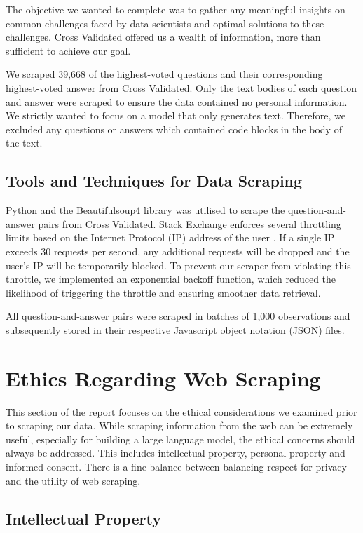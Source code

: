 \documentclass[10pt]{article}
\begin{document}
The objective we wanted to complete was to gather any meaningful insights on common challenges
faced by data scientists and optimal solutions to these challenges. Cross Validated offered us a wealth of
information, more than sufficient to achieve our goal.

We scraped 39,668 of the highest-voted questions and their corresponding highest-voted answer from Cross Validated.
Only the text bodies of each question and answer were scraped to ensure the data contained no personal information.
We strictly wanted to focus on a model that only generates text. Therefore, we excluded any questions or answers
which contained code blocks in the body of the text.

\subsection{Tools and Techniques for Data Scraping}

Python and the Beautifulsoup4 library \cite{beautifulsoup} was utilised to scrape the question-and-answer pairs
from Cross Validated. Stack Exchange enforces several throttling limits based on the Internet Protocol (IP)
address of the user \cite{stackexchange-throttle}. If a single IP exceeds 30 requests per second, 
any additional requests will be dropped and the user's IP will be temporarily blocked. To prevent our scraper from
violating this throttle, we implemented an exponential backoff function, which reduced the likelihood of
triggering the throttle and ensuring smoother data retrieval.

All question-and-answer pairs were scraped in batches of 1,000 observations and subsequently
stored in their respective Javascript object notation (JSON) files.

\section{Ethics Regarding Web Scraping}

This section of the report focuses on the ethical considerations we examined prior to scraping our data.
While scraping information from the web can be extremely useful, especially for building a large language
model, the ethical concerns should always be addressed. This includes intellectual property, personal
property and informed consent. There is a fine balance between balancing respect for privacy and the
utility of web scraping.

\subsection{Intellectual Property}
\end{document}
